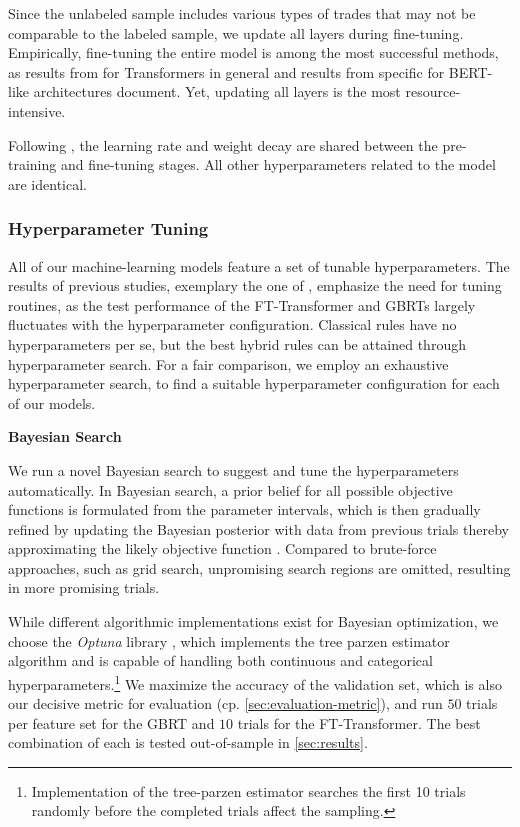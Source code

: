 Since the unlabeled sample includes various types of trades that may not be comparable to the labeled sample, we update all layers during fine-tuning. Empirically, fine-tuning the entire model is among the most successful methods, as results from \textcite[][104--105]{raeScalingLanguageModels2022} for Transformers in general and results from \textcite[][39]{merchantWhatHappensBERT2020} specific for \gls{BERT}-like architectures document. Yet, updating all layers is the most resource-intensive.

Following \textcite[][4]{rubachevRevisitingPretrainingObjectives2022}, the learning rate and weight decay are shared between the pre-training and fine-tuning stages. All other hyperparameters related to the model are identical.

\subsubsection{Hyperparameter Tuning}\label{sec:hyperparameter-tuning}

All of our machine-learning models feature a set of tunable hyperparameters. The results of previous studies, exemplary the one of \textcite[][511]{grinsztajnWhyTreebasedModels2022}, emphasize the need for tuning routines, as the test performance of the FT-Transformer and \glspl{GBRT} largely fluctuates with the hyperparameter configuration. Classical rules have no hyperparameters per se, but the best hybrid rules can be attained through hyperparameter search.
For a fair comparison, we employ an exhaustive hyperparameter search, to find a suitable hyperparameter configuration for each of our models.

\textbf{Bayesian Search}

We run a novel Bayesian search to suggest and tune the hyperparameters automatically. In Bayesian search, a prior belief for all possible objective functions is formulated from the parameter intervals, which is then gradually refined by updating the Bayesian posterior with data from previous trials thereby approximating the likely objective function \autocite[][149]{shahriariTakingHumanOut2016}. Compared to brute-force approaches, such as grid search, unpromising search regions are omitted, resulting in more promising trials.

While different algorithmic implementations exist for Bayesian optimization, we choose the \emph{Optuna} library \autocite[][2623--2631]{akibaOptunaNextgenerationHyperparameter2019}, which implements the tree parzen estimator algorithm and is capable of handling both continuous and categorical hyperparameters.\footnote{Implementation of the tree-parzen estimator searches the first 10 trials randomly before the completed trials affect the sampling.} We maximize the accuracy of the validation set, which is also our decisive metric for evaluation (cp. \cref{sec:evaluation-metric}), and run $\num{50}$ trials per feature set for the \gls{GBRT} and $\num{10}$ trials for the FT-Transformer. The best combination of each is tested out-of-sample in \cref{sec:results}.

